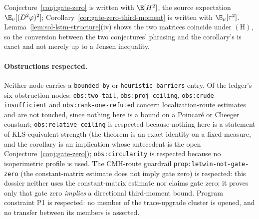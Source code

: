 \documentclass[../main.tex]{subfiles}
\begin{document}
\begin{remark}
\label{rem:sol-lstm-coordinates}
Conjecture~\ref{conj:gate-zero} is written with $\E[H^2]$, the source expectation
$\E_\nu[(D^2\varphi)^2]$; Corollary~\ref{cor:gate-zero-third-moment} is written with
$\E_\mu[\tau^2]$.  Lemma~\ref{lem:sol-lstm-structure}(iv) shows the two matrices coincide
under $(\mathrm H)$, so the conversion between the two conjectures' phrasing and the
corollary's is exact and not merely up to a Jensen inequality.
\end{remark}

\paragraph{Obstructions respected.}
Neither node carries a \texttt{bounded\_by} or \texttt{heuristic\_barriers} entry.  Of the
ledger's six obstruction nodes: \texttt{obs:two-tail}, \texttt{obs:proj-ceiling},
\texttt{obs:crude-insufficient} and \texttt{obs:rank-one-refuted} concern localization-route
estimates and are not touched, since nothing here is a bound on a Poincar\'e or Cheeger
constant; \texttt{obs:relative-ceiling} is respected because nothing here is a statement of
KLS-equivalent strength (the theorem is an exact identity on a fixed measure, and the
corollary is an implication whose antecedent is the open Conjecture~\ref{conj:gate-zero});
\texttt{obs:circularity} is respected because no isoperimetric profile is used.  The CMH-route
guardrail \texttt{prop:letwin-not-gate-zero} (the constant-matrix estimate does not imply
gate zero) is respected: this dossier neither uses the constant-matrix estimate nor claims
gate zero; it proves only that gate zero \emph{implies} a directional third-moment bound.
Program constraint P1 is respected: no member of the trace-upgrade cluster is opened, and no
transfer between its members is asserted.

\end{document}
